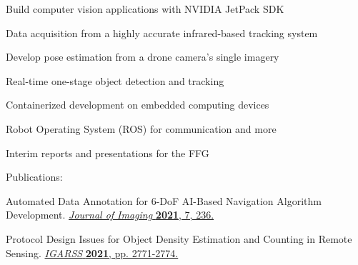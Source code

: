 \begin{tightemize}
    \item Build computer vision applications with NVIDIA JetPack SDK
    \item Data acquisition from a highly accurate infrared-based tracking system
    \item Develop pose estimation from a drone camera's single imagery
    \item Real-time one-stage object detection and tracking
    \item Containerized development on embedded computing devices
    \item Robot Operating System (ROS) for communication and more
    \item Interim reports and presentations for the FFG
\end{tightemize}
\textsf{Publications:}
\begin{tightemize}
    \item Automated Data Annotation for 6-DoF AI-Based Navigation Algorithm Development. \href{https://doi.org/10.3390/jimaging7110236}{\textit{Journal of Imaging} \textbf{2021}, 7, 236.}
    \item Protocol Design Issues for Object Density Estimation and Counting in Remote Sensing. \href{https://doi.org/10.1109/IGARSS47720.2021.9553934}{\textit{IGARSS} \textbf{2021}, pp. 2771-2774.}
\end{tightemize}
